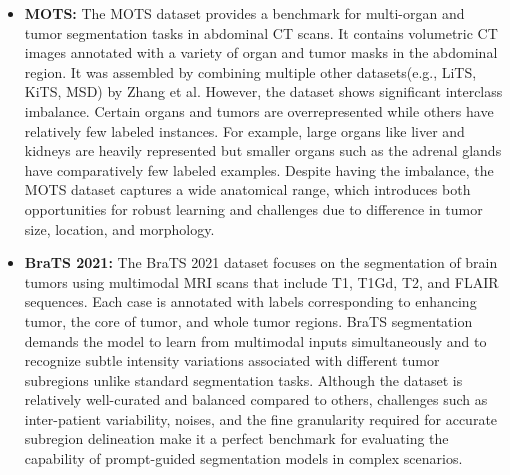 \documentclass{cls/iutbscthesis}
\begin{document}
\begin{itemize}
    \item \textbf{MOTS:} The MOTS dataset provides a benchmark for multi-organ and tumor segmentation tasks in abdominal CT scans. It contains volumetric CT images annotated with a variety of organ and tumor masks in the abdominal region. It was assembled by combining multiple other datasets(e.g., LiTS, KiTS, MSD) by  Zhang et al\cite{zhang2021dodnet}. However, the dataset shows significant interclass imbalance. Certain organs and tumors are overrepresented while others have relatively few labeled instances. For example, large organs like liver and kidneys are heavily represented but smaller organs such as the adrenal glands have comparatively few labeled examples. Despite having the imbalance, the MOTS dataset captures a wide anatomical range, which introduces both opportunities for robust learning and challenges due to difference in tumor size, location, and morphology.
    
    \item \textbf{BraTS 2021:} The BraTS 2021 dataset focuses on the segmentation of brain tumors using multimodal MRI scans that include T1, T1Gd, T2, and FLAIR sequences. Each case is annotated with labels corresponding to enhancing tumor, the core of tumor, and whole tumor regions. BraTS segmentation demands the model to learn from multimodal inputs simultaneously and to recognize subtle intensity variations associated with different tumor subregions unlike standard segmentation tasks. Although the dataset is relatively well-curated and balanced compared to others, challenges such as inter-patient variability, noises, and the fine granularity required for accurate subregion delineation make it a perfect benchmark for evaluating the capability of prompt-guided segmentation models in complex scenarios.
    

\end{itemize}
\end{document}
